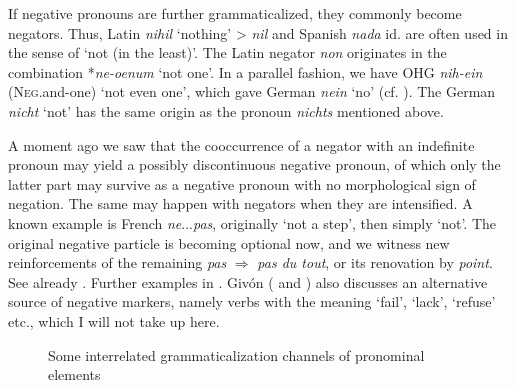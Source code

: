 If negative pronouns are further grammaticalized, they commonly become negators. Thus, Latin \textit{nihil} ‘nothing’ {\textgreater} \textit{nil} and Spanish \textit{nada} id. are often used in the sense of ‘not (in the least)’. The Latin negator \textit{non} originates in the combination *\textit{ne-oenum} ‘not one’. In a parallel fashion, we have OHG \textit{nih-ein} (\textsc{Neg}.and-one) ‘not even one’, which gave German \textit{nein} ‘no’ (cf. \citealt[140]{Meillet1912}). The German \textit{nicht} ‘not’ has the same origin as the pronoun \textit{nichts} mentioned above.

A moment ago we saw that the cooccurrence of a negator with an indefinite pronoun may yield a possibly discontinuous negative pronoun, of which only the latter part may survive as a negative pronoun with no morphological sign of negation. The same may happen with negators when they are intensified. A known example is French \textit{ne}...\textit{pas}, originally ‘not a step’, then simply ‘not’. The original negative particle is becoming optional now, and we witness new reinforcements of the remaining \textit{pas} $\Rightarrow $ \textit{pas du tout}, or its renovation by \textit{point}. See already \citet[140]{Meillet1912}. Further examples in \citet[204]{Givón1979a}. Givón (\citeyear[204]{Givón1979a} and \citeyear[917]{Givón1973}) also discusses an alternative source of negative markers, namely verbs with the meaning ‘fail’, ‘lack’, ‘refuse’ etc., which I will not take up here.


\begin{figure}
	\caption{Some interrelated grammaticalization channels of pronominal elements} \label{interrelatedpronomel}
\end{figure}

